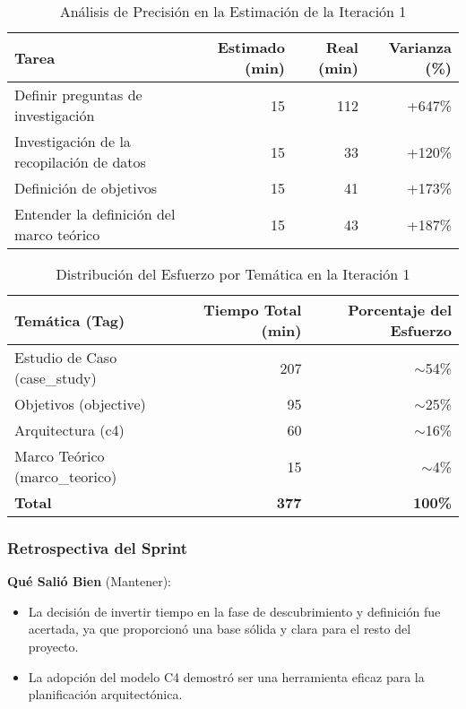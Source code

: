 \begin{table}[H]
    \caption{Análisis de Precisión en la Estimación de la Iteración 1}
    \label{tab:sprint-1-estimation-accuracy}
    \begin{tabularx}{\textwidth}{@{}Xrrr@{}}
        \toprule
        \textbf{Tarea} & \textbf{Estimado (min)} & \textbf{Real (min)} & \textbf{Varianza (\%)} \\
        \midrule
        Definir preguntas de investigación & 15 & 112 & +647\% \\
        Investigación de la recopilación de datos & 15 & 33 & +120\% \\
        Definición de objetivos & 15 & 41 & +173\% \\
        Entender la definición del marco teórico & 15 & 43 & +187\% \\
        \bottomrule
    \end{tabularx}
\end{table}

\begin{table}[H]
    \caption{Distribución del Esfuerzo por Temática en la Iteración 1}
    \label{tab:sprint-1-effort-distribution}
    \begin{tabularx}{\textwidth}{@{}Xrr@{}}
        \toprule
        \textbf{Temática (Tag)} & \textbf{Tiempo Total (min)} & \textbf{Porcentaje del Esfuerzo} \\
        \midrule
        Estudio de Caso (case\_study) & 207 & $\sim$54\% \\
        Objetivos (objective) & 95 & $\sim$25\% \\
        Arquitectura (c4) & 60 & $\sim$16\% \\
        Marco Teórico (marco\_teorico) & 15 & $\sim$4\% \\
        \midrule
        \textbf{Total} & \textbf{377} & \textbf{100\%} \\
        \bottomrule
    \end{tabularx}
\end{table}

\subsubsection{Retrospectiva del Sprint}

\textbf{Qué Salió Bien} (Mantener):
\begin{itemize}
    \item La decisión de invertir tiempo en la fase de descubrimiento y definición fue acertada, ya que proporcionó una base sólida y clara para el resto del proyecto.
    \item La adopción del modelo C4 demostró ser una herramienta eficaz para la planificación arquitectónica.
\end{itemize}

